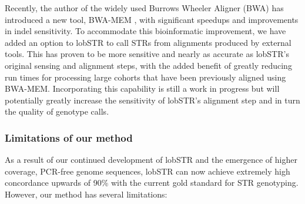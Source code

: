 Recently, the author of the widely used Burrows Wheeler Aligner (BWA) \cite{LiDurbin2009a} has introduced a new tool, BWA-MEM \cite{2013arXiv1303.3997L}, with significant speedups and improvements in indel sensitivity. To accommodate this bioinformatic improvement, we have added an option to lobSTR to call STRs from alignments produced by external tools. This has proven to be more sensitive and nearly as accurate as lobSTR's original sensing and alignment steps, with the added benefit of greatly reducing run times for processing large cohorts that have been previously aligned using BWA-MEM. Incorporating this capability is still a work in progress but will potentially greatly increase the sensitivity of lobSTR's alignment step and in turn the quality of genotype calls.

\subsubsection{Limitations of our method}
As a result of our continued development of lobSTR and the emergence of higher coverage, PCR-free genome sequences, lobSTR can now achieve extremely high concordance upwards of 90\% with the current gold standard for STR genotyping. However, our method has several limitations:

